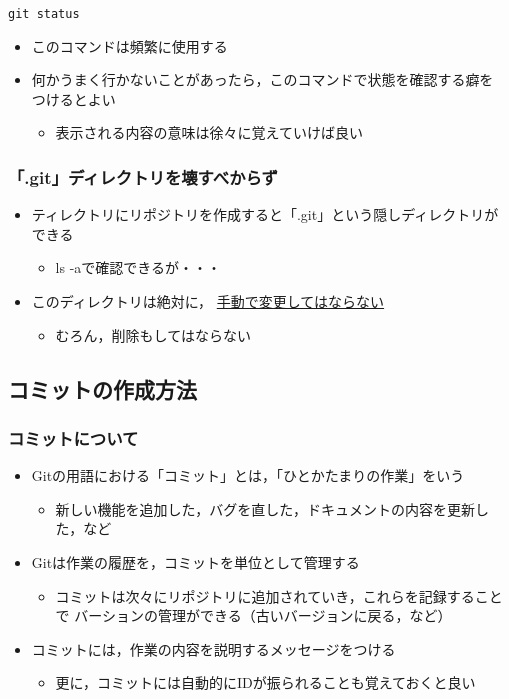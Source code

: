 \documentclass[a4paper,twoside,twocolumn]{bxjsarticle}
\begin{document}
\begin{verbatim}
git status
\end{verbatim}

\begin{itemize}
\item このコマンドは頻繁に使用する
\item 何かうまく行かないことがあったら，このコマンドで状態を確認する癖を
つけるとよい
\begin{itemize}
\item 表示される内容の意味は徐々に覚えていけば良い
\end{itemize}
\end{itemize}

\subsubsection{「.git」ディレクトリを壊すべからず}
\label{sec-1-2-5}
\begin{itemize}
\item ティレクトリにリポジトリを作成すると「.git」という隠しディレクトリが
できる
\begin{itemize}
\item ls -aで確認できるが・・・
\end{itemize}
\item このディレクトリは絶対に， \uline{手動で変更してはならない}
\begin{itemize}
\item むろん，削除もしてはならない
\end{itemize}
\end{itemize}

\subsection{コミットの作成方法}
\label{sec-1-3}
\subsubsection{コミットについて}
\label{sec-1-3-1}
\begin{itemize}
\item Gitの用語における「コミット」とは，「ひとかたまりの作業」をいう
\begin{itemize}
\item 新しい機能を追加した，バグを直した，ドキュメントの内容を更新した，など
\end{itemize}
\item Gitは作業の履歴を，コミットを単位として管理する
\begin{itemize}
\item コミットは次々にリポジトリに追加されていき，これらを記録することで
バーションの管理ができる（古いバージョンに戻る，など）
\end{itemize}
\item コミットには，作業の内容を説明するメッセージをつける
\begin{itemize}
\item 更に，コミットには自動的にIDが振られることも覚えておくと良い
\end{itemize}
\end{itemize}
\end{document}
